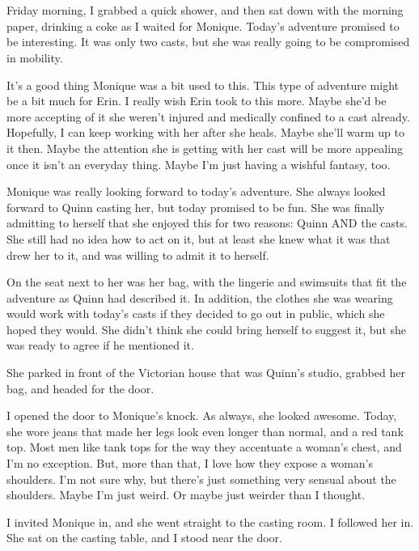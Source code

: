 \chapter{}
Friday morning, I grabbed a quick shower, and then sat down with the morning paper,
drinking a coke as I waited for Monique. Today's adventure promised to be interesting. It was
only two casts, but she was really going to be compromised in mobility.

It's a good thing Monique was a bit used to this. This type of adventure might be a bit
much for Erin. I really wish Erin took to this more. Maybe she'd be more accepting of it she
weren't injured and medically confined to a cast already. Hopefully, I can keep working with her
after she heals. Maybe she'll warm up to it then. Maybe the attention she is getting with her
cast will be more appealing once it isn't an everyday thing. Maybe I'm just having a wishful
fantasy, too.

Monique was really looking forward to today's adventure. She always looked forward to
Quinn casting her, but today promised to be fun. She was finally admitting to herself that she
enjoyed this for two reasons: Quinn AND the casts. She still had no idea how to act on it, but
at least she knew what it was that drew her to it, and was willing to admit it to herself.

On the seat next to her was her bag, with the lingerie and swimsuits that fit the
adventure as Quinn had described it. In addition, the clothes she was wearing would work with
today's casts if they decided to go out in public, which she hoped they would. She didn't think
she could bring herself to suggest it, but she was ready to agree if he mentioned it.

She parked in front of the Victorian house that was Quinn's studio, grabbed her bag, and
headed for the door.

I opened the door to Monique's knock. As always, she looked awesome. Today, she wore jeans
that made her legs look even longer than normal, and a red tank top. Most men like tank tops for
the way they accentuate a woman's chest, and I'm no exception. But, more than that, I love how
they expose a woman's shoulders. I'm not sure why, but there's just something very sensual about
the shoulders. Maybe I'm just weird. Or maybe just weirder than I thought.

I invited Monique in, and she went straight to the casting room. I followed her in. She
sat on the casting table, and I stood near the door.

